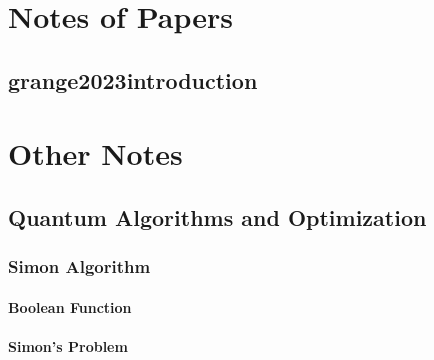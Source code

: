 \documentclass[
	11pt, %
	a4paper, %
]{LegrandOrangeBook}
\begin{document}



\part{Notes of Papers}


\chapter{grange2023introduction}







\part{Other Notes}

\chapter{Quantum Algorithms and Optimization}
\section{Simon Algorithm}
\subsection{Boolean Function}


\subsection{Simon's Problem}

\end{document}
